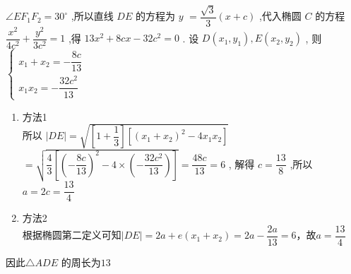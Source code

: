\begin{enumerate}
\begin{jieda}
        $\angle E{F}_{1}{F}_{2} = {30}^{ \circ  }$ ,所以直线 ${DE}$ 的方程为 $y$  $= \dfrac{\sqrt{3}}{3}\left( {x + c}\right)$ ,代入椭圆 $C$ 的方程 $\dfrac{{x}^{2}}{4{c}^{2}} + \dfrac{{y}^{2}}{3{c}^{2}} = 1$ ,得 ${13}{x}^{2} + {8cx} - {32}{c}^{2} = 0$ . 设 $D\left( {{x}_{1},{y}_{1}}\right) ,E\left( {{x}_{2},{y}_{2}}\right)$ , 则 $\left\{\begin{array}{l}
             {x}_{1} + {x}_{2} =  - \dfrac{8c}{13}  \\
             {x}_{1}{x}_{2} =  - \dfrac{{32}{c}^{2}}{13} 
        \end{array} \right .$
        \begin{enumerate}
            \item 方法1 \\
            所以 $\left| {DE}\right|  = \sqrt{\left\lbrack  {1 + \dfrac{1}{3}}\right\rbrack  \left\lbrack  {{\left( {x}_{1} + {x}_{2}\right) }^{2} - 4{x}_{1}{x}_{2}}\right\rbrack  }$  $= \sqrt{\dfrac{4}{3}\left\lbrack  {{\left( -\dfrac{8c}{13}\right) }^{2} - 4 \times  \left( {-\dfrac{{32}{c}^{2}}{13}}\right) }\right\rbrack  } = \dfrac{48c}{13} = 6$ , 解得 $c = \dfrac{13}{8}$ ,所以 $a = {2c} = \dfrac{13}{4}$
            \item 方法2 \\
            根据椭圆第二定义可知$|DE| = 2a+e(x_1+x_2) = 2a - \dfrac{2a}{13} = 6$，故$a = \dfrac{13}{4}$
        \end{enumerate}

        因此$\bigtriangleup {ADE}$ 的周长为$13$
    \end{jieda}
\end{enumerate}